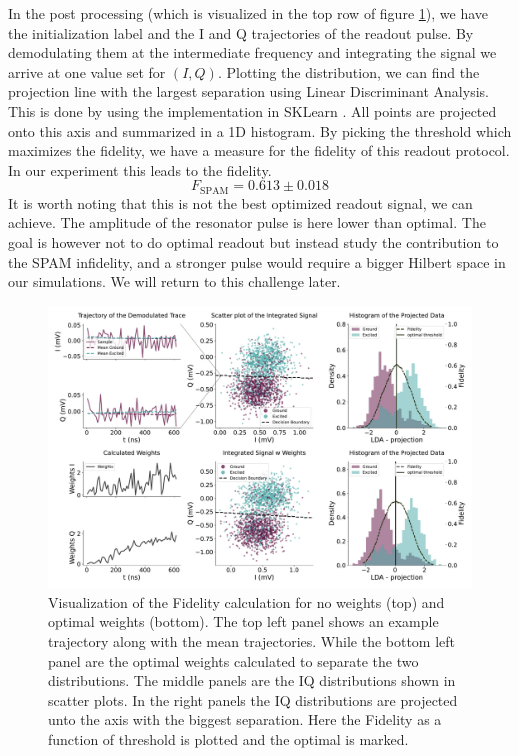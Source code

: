 In the post processing (which is visualized in the top row of figure \ref{fig:readout_process}), we have the initialization label and the I and Q trajectories of the readout pulse. By demodulating them at the intermediate frequency and integrating the signal we arrive at one value set for $(I, Q)$. Plotting the distribution, we can find the projection line with the largest separation using Linear Discriminant Analysis. This is done by using the implementation in SKLearn \cite{pedregosa_scikit-learn_nodate}. All points are projected onto this axis and summarized in a 1D histogram. By picking the threshold which maximizes the fidelity, we have a measure for the fidelity of this readout protocol. In our experiment this leads to the fidelity.
\begin{equation}
    F_{\text{SPAM}} = 0.613\pm 0.018
\end{equation}
It is worth noting that this is not the best optimized readout signal, we can achieve. The amplitude of the resonator pulse is here lower than optimal. The goal is however not to do optimal readout but instead study the contribution to the SPAM infidelity, and a stronger pulse would require a bigger Hilbert space in our simulations. We will return to this challenge later.
\begin{figure}[t]
    \centering
    \includegraphics{Readout/Figs/Introduction.pdf}
    \caption{Visualization of the Fidelity calculation for no weights (top) and optimal weights (bottom). The top left panel shows an example trajectory along with the mean trajectories. While the bottom left panel are the optimal weights calculated to separate the two distributions. The middle panels are the IQ distributions shown in scatter plots. In the right panels the IQ distributions are projected unto the axis with the biggest separation. Here the Fidelity as a function of threshold is plotted and the optimal is marked.}
    \label{fig:readout_process}
\end{figure}



